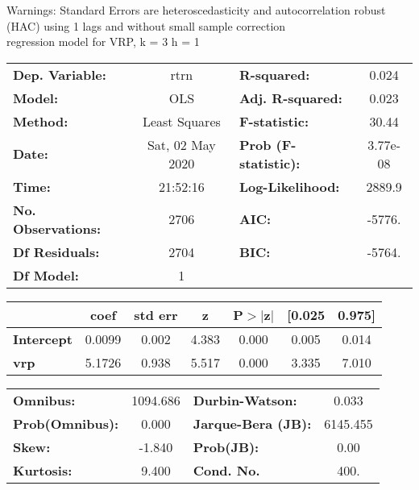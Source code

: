 Warnings: \newline
 [1] Standard Errors are heteroscedasticity and autocorrelation robust (HAC) using 1 lags and without small sample correction\\ 

regression model for VRP, k = 3 h = 1\begin{center}
\begin{tabular}{lclc}
\toprule
\textbf{Dep. Variable:}    &       rtrn       & \textbf{  R-squared:         } &     0.024   \\
\textbf{Model:}            &       OLS        & \textbf{  Adj. R-squared:    } &     0.023   \\
\textbf{Method:}           &  Least Squares   & \textbf{  F-statistic:       } &     30.44   \\
\textbf{Date:}             & Sat, 02 May 2020 & \textbf{  Prob (F-statistic):} &  3.77e-08   \\
\textbf{Time:}             &     21:52:16     & \textbf{  Log-Likelihood:    } &    2889.9   \\
\textbf{No. Observations:} &        2706      & \textbf{  AIC:               } &    -5776.   \\
\textbf{Df Residuals:}     &        2704      & \textbf{  BIC:               } &    -5764.   \\
\textbf{Df Model:}         &           1      & \textbf{                     } &             \\
\bottomrule
\end{tabular}
\begin{tabular}{lcccccc}
                   & \textbf{coef} & \textbf{std err} & \textbf{z} & \textbf{P$> |$z$|$} & \textbf{[0.025} & \textbf{0.975]}  \\
\midrule
\textbf{Intercept} &       0.0099  &        0.002     &     4.383  &         0.000        &        0.005    &        0.014     \\
\textbf{vrp}       &       5.1726  &        0.938     &     5.517  &         0.000        &        3.335    &        7.010     \\
\bottomrule
\end{tabular}
\begin{tabular}{lclc}
\textbf{Omnibus:}       & 1094.686 & \textbf{  Durbin-Watson:     } &    0.033  \\
\textbf{Prob(Omnibus):} &   0.000  & \textbf{  Jarque-Bera (JB):  } & 6145.455  \\
\textbf{Skew:}          &  -1.840  & \textbf{  Prob(JB):          } &     0.00  \\
\textbf{Kurtosis:}      &   9.400  & \textbf{  Cond. No.          } &     400.  \\
\bottomrule
\end{tabular}
\end{center}

